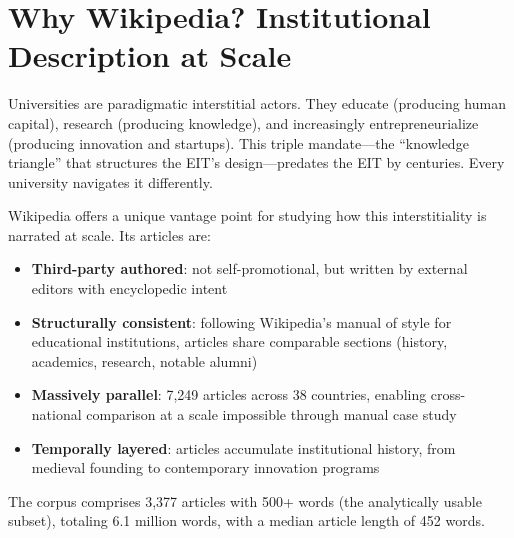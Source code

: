 \documentclass[../main.tex]{subfiles}
\begin{document}
\section*{Why Wikipedia? Institutional Description at Scale}

Universities are paradigmatic interstitial actors. They educate (producing human
capital), research (producing knowledge), and increasingly entrepreneurialize
(producing innovation and startups). This triple mandate---the ``knowledge
triangle'' that structures the EIT's design---predates the EIT by centuries.
Every university navigates it differently.

Wikipedia offers a unique vantage point for studying how this interstitiality
is narrated at scale. Its articles are:

\begin{itemize}
    \item \textbf{Third-party authored}: not self-promotional, but written by
    external editors with encyclopedic intent
    \item \textbf{Structurally consistent}: following Wikipedia's manual of
    style for educational institutions, articles share comparable sections
    (history, academics, research, notable alumni)
    \item \textbf{Massively parallel}: 7,249 articles across 38 countries,
    enabling cross-national comparison at a scale impossible through manual
    case study
    \item \textbf{Temporally layered}: articles accumulate institutional
    history, from medieval founding to contemporary innovation programs
\end{itemize}

The corpus comprises 3,377 articles with 500+ words
(the analytically usable subset), totaling 6.1 million words,
with a median article length of 452 words.
\end{document}
